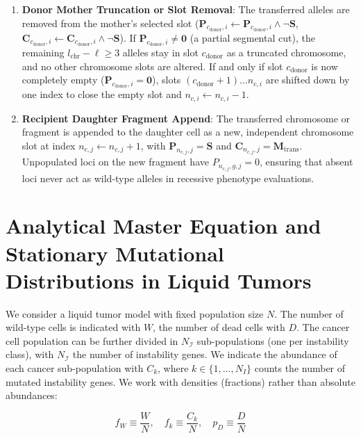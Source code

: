 \documentclass[11pt,a4paper]{article}
\begin{document}
\begin{enumerate}
    \item \textbf{Donor Mother Truncation or Slot Removal}: The transferred alleles are removed from the mother's selected slot ($\mathbf{P}_{c_{\text{donor}}, i} \leftarrow \mathbf{P}_{c_{\text{donor}}, i} \land \neg\mathbf{S}$, $\mathbf{C}_{c_{\text{donor}}, i} \leftarrow \mathbf{C}_{c_{\text{donor}}, i} \land \neg\mathbf{S}$). If $\mathbf{P}_{c_{\text{donor}}, i} \neq \mathbf{0}$ (a partial segmental cut), the remaining $l_{\text{chr}} - \ell \ge 3$ alleles stay in slot $c_{\text{donor}}$ as a truncated chromosome, and no other chromosome slots are altered. If and only if slot $c_{\text{donor}}$ is now completely empty ($\mathbf{P}_{c_{\text{donor}}, i} = \mathbf{0}$), slots $(c_{\text{donor}}+1) \dots n_{c, i}$ are shifted down by one index to close the empty slot and $n_{c, i} \leftarrow n_{c, i} - 1$.
    \item \textbf{Recipient Daughter Fragment Append}: The transferred chromosome or fragment is appended to the daughter cell as a new, independent chromosome slot at index $n_{c, j} \leftarrow n_{c, j} + 1$, with $\mathbf{P}_{n_{c, j}, j} = \mathbf{S}$ and $\mathbf{C}_{n_{c, j}, j} = \mathbf{M}_{\text{trans}}$. Unpopulated loci on the new fragment have $P_{n_{c, j}, g, j} = 0$, ensuring that absent loci never act as wild-type alleles in recessive phenotype evaluations.
\end{enumerate}

\clearpage

\section{Analytical Master Equation and Stationary Mutational Distributions in Liquid Tumors}
\label{sec:analytical}

We consider a liquid tumor model with fixed population size $N$. The number of wild-type cells is indicated with $W$, the number of dead cells with $D$. The cancer cell population can be further divided in $N_{\mathcal{I}}$ sub-populations (one per instability class), with $N_{\mathcal{I}}$ the number of instability genes. We indicate the abundance of each cancer sub-population with $C_k$, where $k \in \{1, \dots, N_I\}$ counts the number of mutated instability genes. We work with densities (fractions) rather than absolute abundances:

\begin{equation}
    f_W \equiv \frac{W}{N}, \quad f_k \equiv \frac{C_k}{N}, \quad p_D \equiv \frac{D}{N}
\end{equation}
\end{document}

